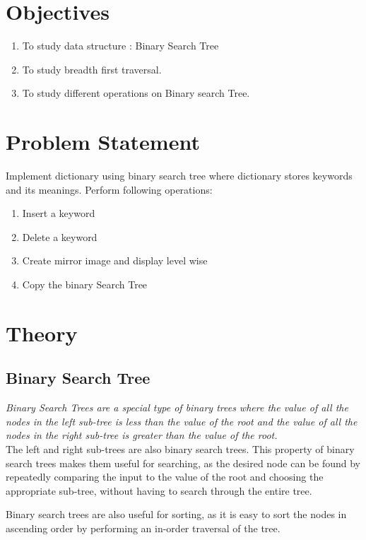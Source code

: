 \documentclass[11pt]{article}
\begin{document}
\tableofcontents
\thispagestyle{empty}
\clearpage

\setcounter{page}{1}

\section{Objectives}
\begin{enumerate}
	\item To study data structure : Binary Search Tree
	\item To study breadth first traversal.
	\item To study different operations on Binary search Tree.
\end{enumerate}

\section{Problem Statement}
Implement dictionary using binary search tree where dictionary stores keywords and its meanings.
Perform following operations:
\begin{enumerate}
	\item Insert a keyword
	\item Delete a keyword
	\item Create mirror image and display level wise
	\item Copy the binary Search Tree
\end{enumerate}

\section{Theory}
\subsection{Binary Search Tree}
\textit{Binary Search Trees are a special type of binary trees where the value of all the nodes in the left sub-tree is less than the value of the root and the value of all the nodes in the right sub-tree is greater than the value of the root.}\\

The left and right sub-trees are also binary search trees. This property of binary search trees makes them useful for searching, as the desired node can be found by repeatedly comparing the input to the value of the root and choosing the appropriate sub-tree, without having to search through the entire tree.

Binary search trees are also useful for sorting, as it is easy to sort the nodes in ascending order by performing an in-order traversal of the tree.
\end{document}
